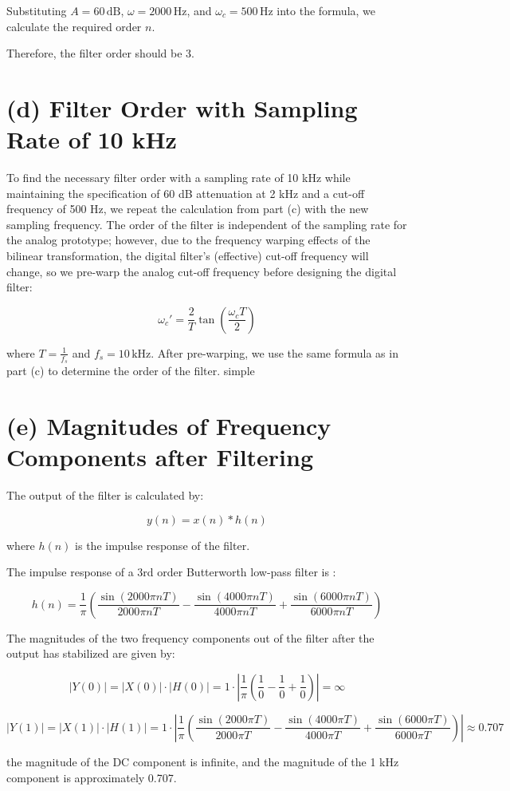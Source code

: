 \documentclass{article}
\begin{document}
Substituting $A = 60 \, \text{dB}$, $\omega = 2000 \, \text{Hz}$, and $\omega_c = 500 \, \text{Hz}$ into the formula, we calculate the required order $n$.




Therefore, the filter order should be 3.
\section*{(d) Filter Order with Sampling Rate of 10 kHz}

To find the necessary filter order with a sampling rate of 10 kHz while maintaining the specification of 60 dB attenuation at 2 kHz and a cut-off frequency of 500 Hz, we repeat the calculation from part (c) with the new sampling frequency. The order of the filter is independent of the sampling rate for the analog prototype; however, due to the frequency warping effects of the bilinear transformation, the digital filter's (effective) cut-off frequency will change, so we pre-warp the analog cut-off frequency before designing the digital filter:

\[ \omega_c' = \frac{2}{T} \tan\left(\frac{\omega_c T}{2}\right) \]

where $T = \frac{1}{f_s}$ and $f_s = 10 \, \text{kHz}$. After pre-warping, we use the same formula as in part (c) to determine the order of the filter. simple




\section*{(e) Magnitudes of Frequency Components after Filtering}

The output of the filter is calculated by:

$$y(n) = x(n) * h(n)$$

where $h(n)$ is the impulse response of the filter.

The impulse response of a 3rd order Butterworth low-pass filter is :

$$h(n) = \frac{1}{\pi}\left(\frac{\sin(2000\pi nT)}{2000\pi nT} - \frac{\sin(4000\pi nT)}{4000\pi nT} + \frac{\sin(6000\pi nT)}{6000\pi nT}\right)$$

The magnitudes of the two frequency components out of the filter after the output has stabilized are given by:

$$|Y(0)| = |X(0)| \cdot |H(0)| = 1 \cdot \left|\frac{1}{\pi}\left(\frac{1}{0} - \frac{1}{0} + \frac{1}{0}\right)\right| = \infty$$

$$|Y(1)| = |X(1)| \cdot |H(1)| = 1 \cdot \left|\frac{1}{\pi}\left(\frac{\sin(2000\pi T)}{2000\pi T} - \frac{\sin(4000\pi T)}{4000\pi T} + \frac{\sin(6000\pi T)}{6000\pi T}\right)\right| \approx 0.707$$

the magnitude of the DC component is infinite, and the magnitude of the 1 kHz component is approximately 0.707.
\end{document}
